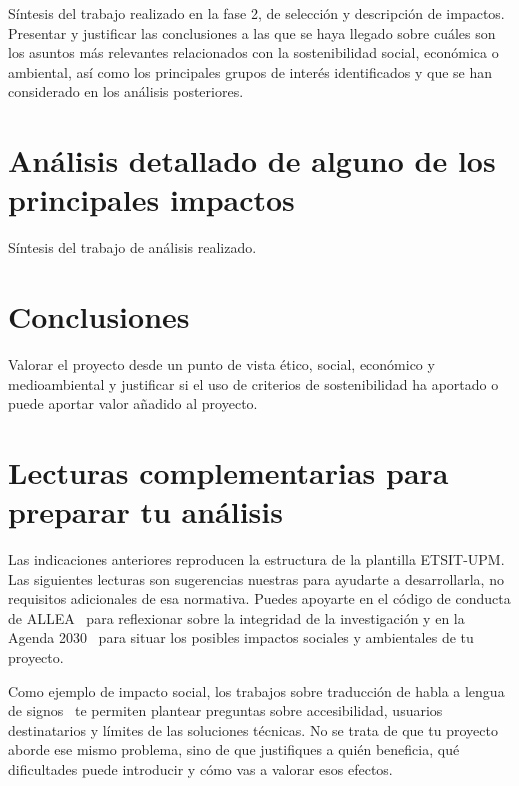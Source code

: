 Síntesis del trabajo realizado en la fase 2, de selección y descripción de impactos. Presentar y justificar las conclusiones a las que se haya llegado sobre cuáles son los asuntos más relevantes relacionados con la sostenibilidad social, económica o ambiental, así como los principales grupos de interés identificados y que se han considerado en los análisis posteriores.

\section{Análisis detallado de alguno de los principales impactos}
\label{sec:aspectos-eticos-analisis}

Síntesis del trabajo de análisis realizado.

\section{Conclusiones}
\label{sec:aspectos-eticos-conclusiones}

Valorar el proyecto desde un punto de vista ético, social, económico y medioambiental y justificar si el uso de criterios de sostenibilidad ha aportado o puede aportar valor añadido al proyecto.

\section*{Lecturas complementarias para preparar tu análisis}

Las indicaciones anteriores reproducen la estructura de la plantilla ETSIT-UPM. Las siguientes lecturas son sugerencias nuestras para ayudarte a desarrollarla, no requisitos adicionales de esa normativa. Puedes apoyarte en el código de conducta de ALLEA~\cite{allea2023integrity} para reflexionar sobre la integridad de la investigación y en la Agenda 2030~\cite{un2030agenda} para situar los posibles impactos sociales y ambientales de tu proyecto.

Como ejemplo de impacto social, los trabajos sobre traducción de habla a lengua de signos~\cite{sansegundo2008speech,sansegundo2008proposing} te permiten plantear preguntas sobre accesibilidad, usuarios destinatarios y límites de las soluciones técnicas. No se trata de que tu proyecto aborde ese mismo problema, sino de que justifiques a quién beneficia, qué dificultades puede introducir y cómo vas a valorar esos efectos.

